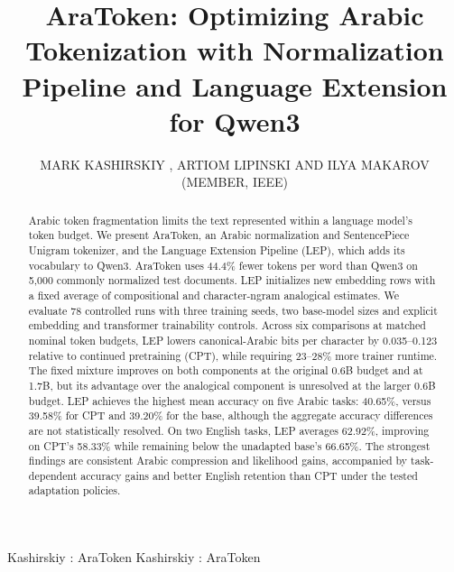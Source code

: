 \documentclass{ieeeaccess}
\begin{document}
\history{}
\doi{}

\title{AraToken: Optimizing Arabic Tokenization with Normalization Pipeline and Language Extension for Qwen3}
\author{\uppercase{Mark Kashirskiy , Artiom Lipinski   and Ilya Makarov (Member, IEEE)}}
\address[1]{HSE University, 101000 Moscow, Russia}
\address[2]{AI Talent Hub, ITMO University, 197101 Saint Petersburg, Russia}
\address[3]{Saint Petersburg State University, 199034 Saint Petersburg, Russia}
\address[4]{Artificial Intelligence Research Institute (AIRI), 105064 Moscow, Russia}
\address[5]{Trusted AI Center, RAS, 109004 Moscow, Russia}

\markboth
{Kashirskiy \headeretal: AraToken}
{Kashirskiy \headeretal: AraToken}


\begin{abstract}
Arabic token fragmentation limits the text represented within a language
model's token budget. We present AraToken, an Arabic normalization and
SentencePiece Unigram tokenizer, and the Language Extension Pipeline
(LEP), which adds its vocabulary to Qwen3. AraToken uses 44.4\% fewer tokens
per word than Qwen3 on 5{,}000 commonly normalized test documents.
LEP initializes new embedding rows with a fixed average of compositional
and character-ngram analogical estimates. We evaluate 78 controlled runs
with three training seeds, two base-model sizes and explicit embedding
and transformer trainability controls. Across six comparisons at matched
nominal token budgets, LEP lowers canonical-Arabic bits per character by
0.035--0.123 relative to continued pretraining (CPT), while requiring
23--28\% more trainer runtime. The fixed mixture improves on both
components at the original 0.6B budget and at 1.7B, but its advantage over
the analogical component is unresolved at the larger 0.6B budget.
LEP achieves the highest mean accuracy on five Arabic tasks: 40.65\%,
versus 39.58\% for CPT and 39.20\% for the base, although the aggregate
accuracy differences are not statistically resolved. On two English tasks,
LEP averages 62.92\%, improving on CPT's 58.33\% while remaining below the
unadapted base's 66.65\%.
The strongest findings are consistent Arabic compression and likelihood
gains, accompanied by task-dependent accuracy gains and better English
retention than CPT under the tested adaptation policies.
\end{abstract}
\end{document}
